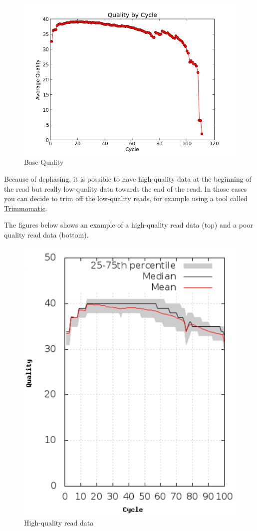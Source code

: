 \documentclass[11pt]{article}
\makeatletter
\def\maxwidth{\ifdim\Gin@nat@width>\linewidth\linewidth
    \else\Gin@nat@width\fi}
\let\Oldincludegraphics\includegraphics
\renewcommand{\includegraphics}[1]{\Oldincludegraphics[width=.8\maxwidth, height=.55\textheight, keepaspectratio]{#1}}
\makeatother
\begin{document}
    \begin{figure}[H]
\centering
\includegraphics{img/base_qual.png}
\caption{Base Quality}
\end{figure}

    Because of dephasing, it is possible to have high-quality data at the
beginning of the read but really low-quality data towards the end of the
read. In those cases you can decide to trim off the low-quality reads,
for example using a tool called
\href{http://www.usadellab.org/cms/?page=trimmomatic}{Trimmomatic}.

The figures below shows an example of a high-quality read data (top) and
a poor quality read data (bottom).

    \begin{figure}[H]
\centering
\includegraphics{img/base_qual_pass.png}
\caption{High-quality read data}
\end{figure}
\end{document}
